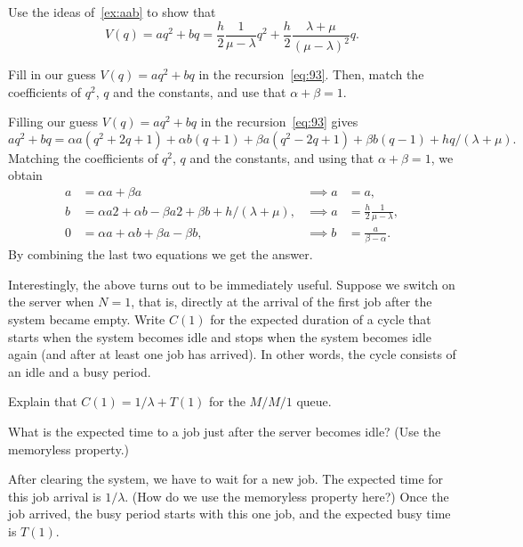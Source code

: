 \begin{exercise}
  Use the ideas of~\cref{ex:aab} to show that
  \begin{equation*}
    V(q) = a q^2 + b q = \frac h 2 \frac 1 {\mu -\lambda} q^2 + \frac h 2 \frac{\lambda + \mu}{(\mu - \lambda)^2}q.
  \end{equation*}

\begin{hint}
  Fill in our guess $V(q) = aq^2 + bq$ in the recursion~\cref{eq:93}.
  Then, match the coefficients of $q^2$, $q$ and the constants, and use that $\alpha + \beta = 1$.
\end{hint}

\begin{solution}
 Filling our guess $V(q) = aq^2 + bq$ in the recursion~\cref{eq:93}  gives
  \begin{equation*}
    aq^2 + b q = \alpha a (q^2 + 2q + 1) + \alpha b (q+1) + \beta a (q^2 - 2q + 1) + \beta b (q - 1) + hq/(\lambda + \mu). 
  \end{equation*}
  Matching the coefficients of $q^2$, $q$ and the constants, and using that $\alpha + \beta = 1$, we obtain
  \begin{align*}
    a &= \alpha a + \beta a &\implies a &= a, \\
    b &= \alpha a 2 + \alpha b - \beta a 2 + \beta b + h/(\lambda + \mu), & \implies a &= \frac h 2 \frac 1 {\mu -\lambda},\\
    0 &= \alpha a + \alpha b + \beta a - \beta b, & \implies b &= \frac a {\beta - \alpha}. 
  \end{align*}
By combining the last two equations we get the answer. 
\end{solution}
\end{exercise}


Interestingly, the above turns out to be immediately useful.
Suppose we switch on the server when $N=1$, that is, directly at the arrival of the first job after the system became empty.
Write $C(1)$ for the expected duration of a cycle that starts when the system becomes idle and stops when the system becomes idle again (and after at least one job has arrived).
In other words, the cycle consists of an idle and a busy period.

\begin{exercise}
Explain that $C(1)=1/\lambda + T(1)$ for the $M/M/1$ queue.
\begin{hint}
  What is the expected  time to a job just after the server becomes idle? (Use the memoryless property.)
\end{hint}
\begin{solution}
  After clearing the system, we have to wait for a new job.
  The expected time for this job arrival is $1/\lambda$.
  (How do we use the memoryless property here?)
  Once the job arrived, the busy period starts with this one job, and the expected busy time is $T(1)$.
\end{solution}
\end{exercise}

